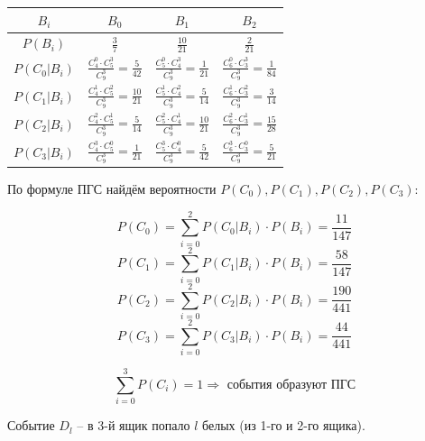 \begin{table}[h]
	\centering\makegapedcells
	\begin{tabular}{|c|c|c|c|}
		\hline
		$B_i$        & $B_0$                                             & $B_1$                                             & $B_2$                                             \\ \hline
		$P(B_i)$     & $\frac{3}{7}$                                     & $\frac{10}{21}$                                   & $\frac{2}{21}$                                    \\ \hline
		$P(C_0|B_i)$ & $\frac{C_4^0 \cdot C_5^3}{C_9^3} = \frac{5}{42}$  & $\frac{C_5^0 \cdot C_4^3}{C_9^3} = \frac{1}{21}$  & $\frac{C_6^0 \cdot C_3^3}{C_9^3} = \frac{1}{84}$  \\ \hline
		$P(C_1|B_i)$ & $\frac{C_4^1 \cdot C_5^2}{C_9^3} = \frac{10}{21}$ & $\frac{C_5^1 \cdot C_4^2}{C_9^3} = \frac{5}{14}$  & $\frac{C_6^1 \cdot C_3^2}{C_9^3} = \frac{3}{14}$  \\ \hline
		$P(C_2|B_i)$ & $\frac{C_4^2 \cdot C_5^1}{C_9^3} = \frac{5}{14}$  & $\frac{C_5^2 \cdot C_4^1}{C_9^3} = \frac{10}{21}$ & $\frac{C_6^2 \cdot C_3^1}{C_9^3} = \frac{15}{28}$ \\ \hline
		$P(C_3|B_i)$ & $\frac{C_4^3 \cdot C_5^0}{C_9^3} = \frac{1}{21}$  & $\frac{C_5^3 \cdot C_4^0}{C_9^3} = \frac{5}{42}$  & $\frac{C_6^3 \cdot C_3^0}{C_9^3} = \frac{5}{21}$  \\ \hline
	\end{tabular}
\end{table}

По формуле ПГС найдём вероятности $P(C_0), P(C_1), P(C_2), P(C_3)$:

\[ P(C_0) = \sum_{i=0}^{2} P(C_0|B_i) \cdot P(B_i) = \dfrac{11}{147} \]
\[ P(C_1) = \sum_{i=0}^{2} P(C_1|B_i) \cdot P(B_i) = \dfrac{58}{147} \]
\[ P(C_2) = \sum_{i=0}^{2} P(C_2|B_i) \cdot P(B_i) = \dfrac{190}{441} \]
\[ P(C_3) = \sum_{i=0}^{2} P(C_3|B_i) \cdot P(B_i) = \dfrac{44}{441} \]

\[ \sum_{i=0}^{3} P(C_i) = 1 \Rightarrow \text{ события образуют ПГС} \]

Событие $D_l$ – в 3-й ящик попало $l$ белых (из 1-го и 2-го ящика).

